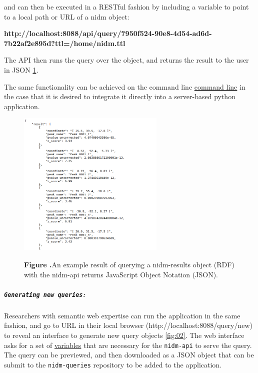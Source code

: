 \documentclass[twocolumn]{bmcart}%
\begin{document}
and can then be executed in a RESTful fashion by including a variable to point to a local path or URL of a nidm object:\newline

\textbf{http://localhost:8088/api/query/7950f524-90e8-4d54-ad6d-7b22af2e895d?ttl=/home/nidm.ttl}\newline

The API then runs the query over the object, and returns the result to the user in JSON \ref{fig:01}.

The same functionality can be achieved on the command line \href{http://nidm-api.readthedocs.org/en/latest/getting-started.html#integration-into-python}{command line} in the case that it is desired to integrate it directly into a server-based python application.

\begin{figure}[h!]
\begin{center}
\includegraphics[width=7cm]{img/figure1}
\end{center}
 \textbf{\label{fig:01}Figure .}{An example result of querying a nidm-results object (RDF) with the nidm-api returns JavaScript Object Notation (JSON).}
\end{figure}

\subparagraph{\texorpdfstring{\texttt{Generating new queries}:}{:}}\label{section}
Researchers with semantic web expertise can run the application in the same fashion, and go to URL in their local browser (http://localhost:8088/query/new) to reveal an interface to generate new query objects \ref{fig:02}. The web interface asks for a set of \href{http://nidm-api.readthedocs.org/en/latest/development.html#fields}{variables} that are necessary for the \texttt{nidm-api} to serve the query. The query can be previewed, and then downloaded as a JSON object that can be submit to the \texttt{nidm-queries} repository to be added to the application.\newline
\end{document}
